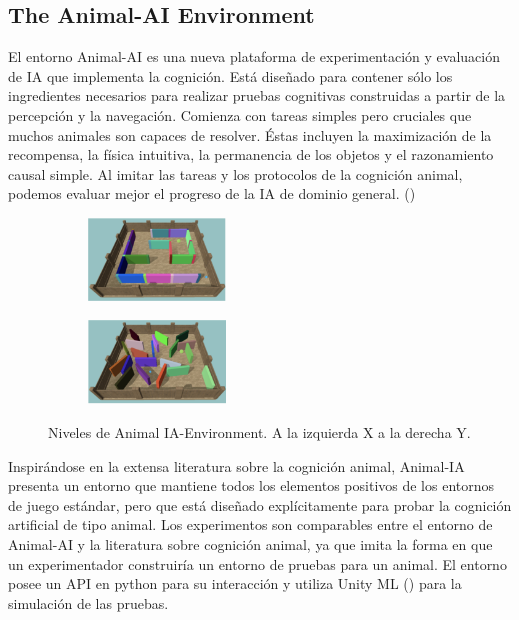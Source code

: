 \subsection{The Animal-AI Environment}

El entorno Animal-AI es una nueva plataforma de experimentación y evaluación de IA que implementa la cognición. Está diseñado para contener sólo los ingredientes necesarios para realizar pruebas cognitivas construidas a partir de la percepción y la navegación. Comienza con tareas simples pero cruciales que muchos animales son capaces de resolver. Éstas incluyen la maximización de la recompensa, la física intuitiva, la permanencia de los objetos y el razonamiento causal simple. Al imitar las tareas y los protocolos de la cognición animal, podemos evaluar mejor el progreso de la IA de dominio general. (\cite{beyret2019animal})

\begin{figure}[ht!]
    \centering
    \begin{subfigure}
      \centering
      \includegraphics[width=0.4\textwidth]{Graphics/animal_1.png}
      \label{fig:animal1}
    \end{subfigure}%
    \begin{subfigure}
      \centering
      \includegraphics[width=0.4\textwidth]{Graphics/animal_3.png}
      \label{fig:animal2}
    \end{subfigure}%
    \caption{Niveles de Animal IA-Environment. A la izquierda X a la derecha Y.}
    \label{fig:animal}
\end{figure}

Inspirándose en la extensa literatura sobre la cognición animal, Animal-IA presenta un entorno que mantiene todos los elementos positivos de los entornos de juego estándar, pero que está diseñado explícitamente para probar la cognición artificial de tipo animal. Los experimentos son comparables entre el entorno de Animal-AI y la literatura sobre cognición animal, ya que imita la forma en que un experimentador construiría un entorno de pruebas para un animal. El entorno posee un API en python para su interacción y utiliza Unity ML (\cite{juliani2018unity}) para la simulación de las pruebas.

